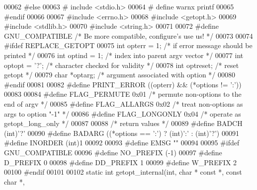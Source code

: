 \begin{DoxyCode}
00062 \textcolor{preprocessor}{#else}
00063 \textcolor{preprocessor}{#   include <stdio.h>}
00064 \textcolor{preprocessor}{#   define warnx printf}
00065 \textcolor{preprocessor}{#endif}
00066 
00067 \textcolor{preprocessor}{#include <errno.h>}
00068 \textcolor{preprocessor}{#include <getopt.h>}
00069 \textcolor{preprocessor}{#include <stdlib.h>}
00070 \textcolor{preprocessor}{#include <string.h>}
00071 
00072 \textcolor{preprocessor}{#define GNU\_COMPATIBLE      }\textcolor{comment}{/* Be more compatible, configure's use us! */}\textcolor{preprocessor}{}
00073 
00074 \textcolor{preprocessor}{#ifdef REPLACE\_GETOPT}
00075 \textcolor{keywordtype}{int} opterr = 1;     \textcolor{comment}{/* if error message should be printed */}
00076 \textcolor{keywordtype}{int} optind = 1;     \textcolor{comment}{/* index into parent argv vector */}
00077 \textcolor{keywordtype}{int} optopt = \textcolor{charliteral}{'?'};   \textcolor{comment}{/* character checked for validity */}
00078 \textcolor{keywordtype}{int} optreset;       \textcolor{comment}{/* reset getopt */}
00079 \textcolor{keywordtype}{char} *optarg;       \textcolor{comment}{/* argument associated with option */}
00080 \textcolor{preprocessor}{#endif}
00081 
00082 \textcolor{preprocessor}{#define PRINT\_ERROR ((opterr) && (*options != ':'))}
00083 
00084 \textcolor{preprocessor}{#define FLAG\_PERMUTE    0x01    }\textcolor{comment}{/* permute non-options to the end of argv */}\textcolor{preprocessor}{}
00085 \textcolor{preprocessor}{#define FLAG\_ALLARGS    0x02    }\textcolor{comment}{/* treat non-options as args to option "-1" */}\textcolor{preprocessor}{}
00086 \textcolor{preprocessor}{#define FLAG\_LONGONLY   0x04    }\textcolor{comment}{/* operate as getopt\_long\_only */}\textcolor{preprocessor}{}
00087 
00088 \textcolor{comment}{/* return values */}
00089 \textcolor{preprocessor}{#define BADCH       (int)'?'}
00090 \textcolor{preprocessor}{#define BADARG      ((*options == ':') ? (int)':' : (int)'?')}
00091 \textcolor{preprocessor}{#define INORDER     (int)1}
00092 
00093 \textcolor{preprocessor}{#define EMSG        ""}
00094 
00095 \textcolor{preprocessor}{#ifdef GNU\_COMPATIBLE}
00096 \textcolor{preprocessor}{#define NO\_PREFIX   (-1)}
00097 \textcolor{preprocessor}{#define D\_PREFIX    0}
00098 \textcolor{preprocessor}{#define DD\_PREFIX   1}
00099 \textcolor{preprocessor}{#define W\_PREFIX    2}
00100 \textcolor{preprocessor}{#endif}
00101 
00102 \textcolor{keyword}{static} \textcolor{keywordtype}{int} getopt\_internal(\textcolor{keywordtype}{int}, \textcolor{keywordtype}{char} * \textcolor{keyword}{const} *, \textcolor{keyword}{const} \textcolor{keywordtype}{char} *,

\end{DoxyCode}
